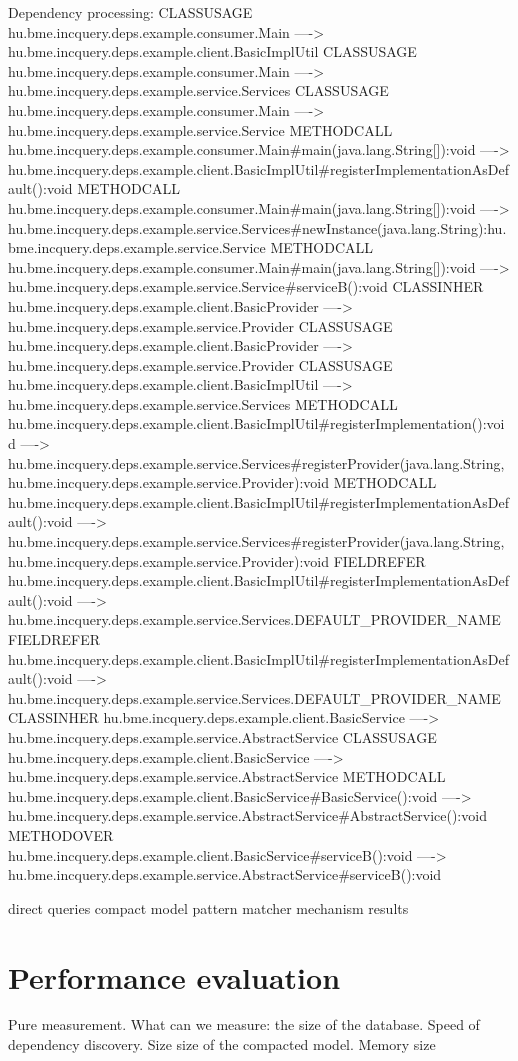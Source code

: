 Dependency processing:
CLASSUSAGE hu.bme.incquery.deps.example.consumer.Main ----> hu.bme.incquery.deps.example.client.BasicImplUtil
CLASSUSAGE hu.bme.incquery.deps.example.consumer.Main ----> hu.bme.incquery.deps.example.service.Services
CLASSUSAGE hu.bme.incquery.deps.example.consumer.Main ----> hu.bme.incquery.deps.example.service.Service
METHODCALL hu.bme.incquery.deps.example.consumer.Main#main(java.lang.String[]):void ----> hu.bme.incquery.deps.example.client.BasicImplUtil#registerImplementationAsDefault():void
METHODCALL hu.bme.incquery.deps.example.consumer.Main#main(java.lang.String[]):void ----> hu.bme.incquery.deps.example.service.Services#newInstance(java.lang.String):hu.bme.incquery.deps.example.service.Service
METHODCALL hu.bme.incquery.deps.example.consumer.Main#main(java.lang.String[]):void ----> hu.bme.incquery.deps.example.service.Service#serviceB():void
CLASSINHER hu.bme.incquery.deps.example.client.BasicProvider ----> hu.bme.incquery.deps.example.service.Provider
CLASSUSAGE hu.bme.incquery.deps.example.client.BasicProvider ----> hu.bme.incquery.deps.example.service.Provider
CLASSUSAGE hu.bme.incquery.deps.example.client.BasicImplUtil ----> hu.bme.incquery.deps.example.service.Services
METHODCALL hu.bme.incquery.deps.example.client.BasicImplUtil#registerImplementation():void ----> hu.bme.incquery.deps.example.service.Services#registerProvider(java.lang.String,hu.bme.incquery.deps.example.service.Provider):void
METHODCALL hu.bme.incquery.deps.example.client.BasicImplUtil#registerImplementationAsDefault():void ----> hu.bme.incquery.deps.example.service.Services#registerProvider(java.lang.String,hu.bme.incquery.deps.example.service.Provider):void
FIELDREFER hu.bme.incquery.deps.example.client.BasicImplUtil#registerImplementationAsDefault():void ----> hu.bme.incquery.deps.example.service.Services.DEFAULT\_PROVIDER\_NAME
FIELDREFER hu.bme.incquery.deps.example.client.BasicImplUtil#registerImplementationAsDefault():void ----> hu.bme.incquery.deps.example.service.Services.DEFAULT\_PROVIDER\_NAME
CLASSINHER hu.bme.incquery.deps.example.client.BasicService ----> hu.bme.incquery.deps.example.service.AbstractService
CLASSUSAGE hu.bme.incquery.deps.example.client.BasicService ----> hu.bme.incquery.deps.example.service.AbstractService
METHODCALL hu.bme.incquery.deps.example.client.BasicService#BasicService():void ----> hu.bme.incquery.deps.example.service.AbstractService#AbstractService():void
METHODOVER hu.bme.incquery.deps.example.client.BasicService#serviceB():void ----> hu.bme.incquery.deps.example.service.AbstractService#serviceB():void
 
direct queries
compact  model
pattern matcher mechanism
results

\section{Performance evaluation}
Pure measurement. What can we measure:
the size of the database.
Speed of dependency discovery.
Size size of the compacted model. 
Memory size